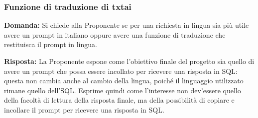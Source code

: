 \subsubsection{Funzione di traduzione di txtai}
\par \textbf{Domanda:} Si chiede alla Proponente se per una richiesta in lingua sia più utile avere un prompt in italiano oppure avere una funzione di traduzione che restituisca il prompt in lingua.

\par \textbf{Risposta:} La Proponente espone come l'obiettivo finale del progetto sia quello di avere un prompt che possa essere incollato per ricevere una risposta in SQL: questa non cambia anche al cambio della lingua, poiché il linguaggio utilizzato rimane quello dell'SQL.
Esprime quindi come l'interesse non dev'essere quello della facoltà di lettura della risposta finale, ma della possibilità di copiare e incollare il prompt per ricevere una risposta in SQL.

